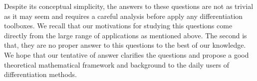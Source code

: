 Despite its conceptual simplicity, the answers to these questions are not as trivial as it may seem and requires a  careful analysis before apply any differentiation toolboxes. We recall that our motivations for studying this questions come directly from the large range of  applications  as mentioned above. The second is that, they are no proper answer to this questions to the best of our knowledge. We hope that our tentative of answer clarifies the questions and propose a good theoretical mathematical framework and background to the daily users of  differentiation methods. 




